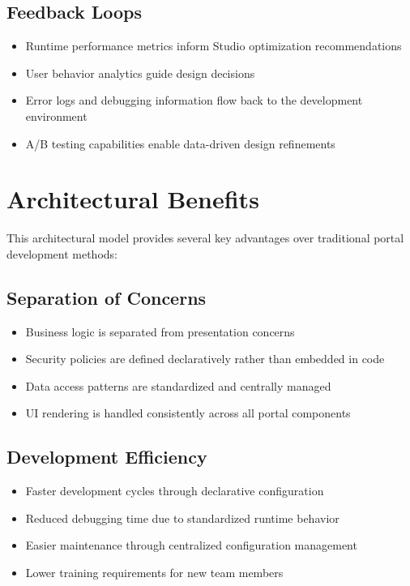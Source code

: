 \subsection{Feedback Loops}

\begin{itemize}
	\item Runtime performance metrics inform Studio optimization recommendations
	\item User behavior analytics guide design decisions
	\item Error logs and debugging information flow back to the development environment
	\item A/B testing capabilities enable data-driven design refinements
\end{itemize}

\section{Architectural Benefits}
\label{sec:architectural-benefits}

This architectural model provides several key advantages over traditional portal development methods:

\subsection{Separation of Concerns}

\begin{itemize}
	\item Business logic is separated from presentation concerns
	\item Security policies are defined declaratively rather than embedded in code
	\item Data access patterns are standardized and centrally managed
	\item UI rendering is handled consistently across all portal components
\end{itemize}

\subsection{Development Efficiency}

\begin{itemize}
	\item Faster development cycles through declarative configuration
	\item Reduced debugging time due to standardized runtime behavior
	\item Easier maintenance through centralized configuration management
	\item Lower training requirements for new team members
\end{itemize}

